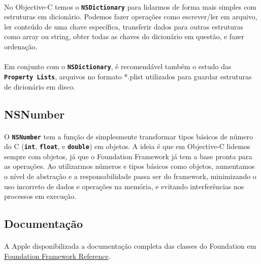 \documentclass[a4paper,12pt,brazil,doubleside]{book}
\begin{document}
\paragraph{}No Objective-C temos o \texttt{\textbf{NSDictionary}} para lidarmos de forma mais simples com estruturas em dicionário. Podemos fazer operações como escrever/ler em arquivo, ler conteúdo de uma chave específica, transferir dados para outras estruturas como array ou string, obter todas as chaves do dicionário em questão, e fazer ordenação.
\paragraph{}Em conjunto com o \texttt{\textbf{NSDictionary}}, é recomendável também o estudo das \texttt{\textbf{Property Lists}}, arquivos no formato *.plist utilizados para guardar estruturas de dicionário em disco.

\bigskip

\subsection{NSNumber}

\paragraph{}O \texttt{\textbf{NSNumber}} tem a função de simplesmente transformar tipos básicos de número do C (\texttt{\textbf{int}}, \texttt{\textbf{float}}, e \texttt{\textbf{double}}) em objetos. A ideia é que em Objective-C lidemos sempre com objetos, já que o Foundation Framework já tem a base pronta para as operações. Ao utilizarmos números e tipos básicos como objetos, aumentamos o nível de abstração e a responsabilidade passa ser do framework, minimizando o uso incorreto de dados e operações na memória, e evitando interferências nos processos em execução.

\bigskip

\subsection{Documentação}

\paragraph{}A Apple disponibilizada a documentação completa das classes do Foundation em
\href{http://developer.apple.com/library/ios/#documentation/Cocoa/Reference/Foundation/ObjC_classic/_index.html}{Foundation Framework Reference}.
\end{document}
